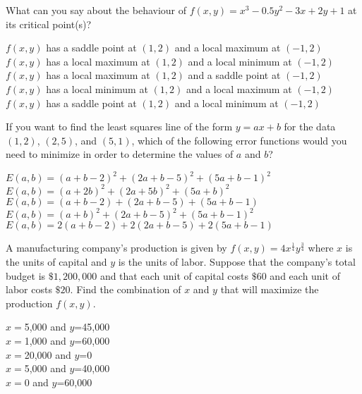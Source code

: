 \documentclass[12pt]{amsart}
\def\ds{\displaystyle}
\begin{document}
\begin{exam}
\begin{problem}
What can you say about the behaviour of $ f(x,y)=x^3-0.5y^2-3x+2y+1$ at its 
critical point(s)? 
\begin{answers}{1}
$f(x, y)$ has a saddle point at $(1, 2)$ and a local maximum at $(-1, 2)$ \\
$f(x, y)$ has a local  maximum at $(1, 2)$ and a local minimum at $(-1, 2)$ \\
$f(x, y)$ has a local  maximum at $(1, 2)$ and a saddle point at $(-1, 2)$ \\
$f(x, y)$ has a local  minimum at $(1, 2)$ and a local maximum at $(-1, 2)$ \\
$f(x, y)$ has a saddle point at $(1, 2)$ and a local minimum at $(-1, 2)$ \\
\end{answers}
\end{problem}


\begin{problem}
If you want to find the least squares line of the form 
$y = ax + b$ for the  data  $(1, 2)$, $(2, 5)$, and $(5, 1)$,
which of the following error functions would you need to minimize in order to determine 
the values of $a$ and $b$?
%
\begin{answers}{1}
$E(a, b) = (a + b - 2)^2 + (2a + b - 5)^2 + (5a + b - 1)^2$ \\
$E(a, b) = (a + 2b)^2 + (2a + 5b)^2 + (5a + b)^2$ \\
$E(a, b) = (a + b - 2) + (2a + b - 5) + (5a + b - 1)$ \\
$E(a, b) = (a + b )^2 + (2a + b - 5)^2 + (5a + b - 1)^2$ \\
$E(a, b) = 2(a + b - 2) + 2(2a + b - 5) + 2(5a + b - 1)$ \\
\end{answers}
\end{problem}
%
\begin{problem}
A manufacturing company's production is given by 
$\ds f(x,y)=4x^{\frac{1}{4}}y^{\frac{3}{4}}$ 
where $x$ is the units of capital and $y$
is the units of labor.  Suppose that the company's total budget is $\$1,200,000$
and that each unit of capital costs $\$60$ and each unit of labor costs $\$20$.
 Find the combination of $x$ and $y$ that will maximize the production
$f(x,y)$.
%
\begin{answers}{1}
$x=$5,000 and $y$=45,000\\
$x=$1,000 and $y$=60,000\\
$x=$20,000 and $y$=0\\
$x=$5,000 and $y$=40,000\\
$x=$0 and $y$=60,000  \\
\end{answers}
\end{problem}






\end{exam}
\end{document}
